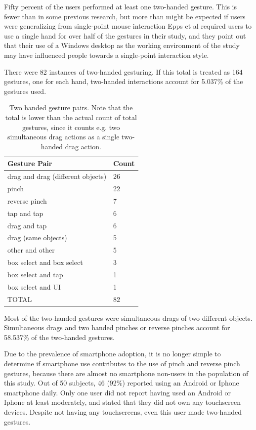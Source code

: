 Fifty percent of the users performed at least one two-handed gesture. 
This is fewer than in some previous research, but more than might be expected if users were generalizing from single-point mouse interaction \cite{micire2010multi, epps2006study}
Epps et al required users to use a single hand for over half of the gestures in their study, and they point out that their use of a Windows desktop as the working environment of the study may have influenced people towards a single-point interaction style. 

There were 82 instances of two-handed gesturing. 
If this total is treated as 164 gestures, one for each hand, two-handed interactions account for 5.037\% of the gestures used.

\begin{table}
	\centering
	\begin{tabular}{l l}
		Gesture Pair & Count\\
		\hline
		drag and drag (different objects) & 26 \\
		pinch & 22\\
		reverse pinch & 7\\
		tap and tap & 6\\
		drag and tap & 6\\
		drag (same objects) & 5\\
		other and other & 5\\		
		box select and box select & 3\\
		box select and tap & 1\\
		box select and UI & 1\\
		\hline
		TOTAL & 82\\
	\end{tabular}
	\caption{Two handed gesture pairs. Note that the total is lower than the actual count of total gestures, since it counts e.g. two simultaneous drag actions as a single two-handed drag action.}
\end{table}

Most of the two-handed gestures were simultaneous drags of two different objects. 
Simultaneous drags and two handed pinches or reverse pinches account for 58.537\% of the two-handed gestures.  

Due to the prevalence of smartphone adoption, it is no longer simple to determine if smartphone use contributes to the use of pinch and reverse pinch gestures, because there are almost no smartphone non-users in the population of this study. 
Out of 50 subjects, 46 (92\%) reported using an Android or Iphone smartphone daily. 
Only one user did not report having used an Android or Iphone at least moderately, and stated that they did not own any touchscreen devices. 
Despite not having any touchscreens, even this user made two-handed gestures. 

